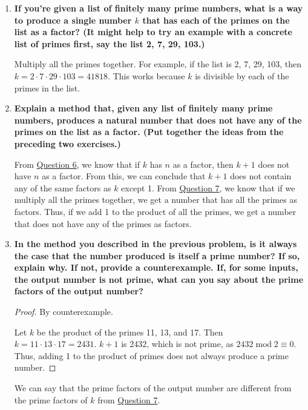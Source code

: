 \documentclass[article, 12pt]{article}
\theoremstyle{definition}
\newcommand{\Mod}[1]{\;\mathrm{mod}\; #1} %
\begin{document}
\begin{enumerate}[(1)]
\begin{proof}
            Therefore, $\forall k(P(k) \to \neg P(k+1))$, meaning if $k$ has $n$ as a factor, $k+1$ cannot have $n$ as a factor.
        \end{proof}
        \item \textbf{If you’re given a list of finitely many prime numbers, what is a way to produce a single number $k$ that has each of the primes on the list as a factor? (It might help to try an example with a concrete list of primes first, say the list 2, 7, 29, 103.)} \label{question:produce k}
        
        Multiply all the primes together. For example, if the list is 2, 7, 29, 103, then $k = 2 \cdot 7 \cdot 29 \cdot 103=41818$. This works because $k$ is divisible by each of the primes in the list.
        \item \textbf{Explain a method that, given any list of finitely many prime numbers, produces a natural number that does not have any of the primes on the list as a factor. (Put together the ideas from the preceding two exercises.)}\label{question:full proof}
        
        From \hyperref[question:k + 1 cannot have n as a factor]{Question 6}, we know that if $k$ has $n$ as a factor, then $k+1$ does not have $n$ as a factor. From this, we can conclude that $k+1$ does not contain any of the same factors as $k$ except 1. From \hyperref[question:produce k]{Question 7}, we know that if we multiply all the primes together, we get a number that has all the primes as factors. Thus, if we add 1 to the product of all the primes, we get a number that does not have any of the primes as factors.

        \item \textbf{In the method you described in the previous problem, is it always the case that the number produced is itself a prime number? If so, explain why. If not, provide a counterexample. If, for some inputs, the output number is not prime, what can you say about the prime factors of the output number?}
        \begin{proof} By counterexample. 
            
            Let $k$ be the product of the primes 11, 13, and 17. Then $k = 11 \cdot 13 \cdot 17 = 2431$. $k+1$ is 2432, which is not prime, as $2432 \Mod{2} \equiv 0$. Thus, adding 1 to the product of primes does not always produce a prime number.  
        \end{proof}
        We can say that the prime factors of the output number are different from the prime factors of $k$ from \hyperref[question:produce k]{Question 7}.
    \end{enumerate}
\end{document}
